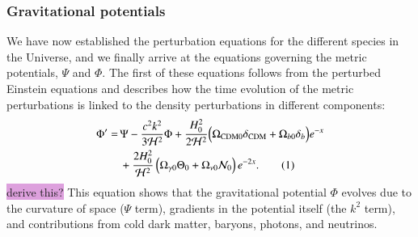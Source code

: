 \documentclass{aa}
\newcommand\numberthis{\addtocounter{equation}{1}\tag{\theequation}}
\numberwithin{equation}{section}
\numberwithin{table}{section}
\numberwithin{figure}{section}
\begin{document}
\subsubsection{Gravitational potentials}
We have now established the perturbation equations for the different species in the Universe, and we finally arrive at the equations governing the metric potentials, $\Psi$ and $\Phi$. 
The first of these equations follows from the perturbed Einstein equations and describes how the time evolution of the metric perturbations is linked to the density perturbations in different components:
\begin{align*}
\Phi' =\, &\Psi - \frac{c^2 k^2}{3\mathcal{H}^2} \Phi + \frac{H_0^2}{2\mathcal{H}^2} \Big(\Omega_{\text{CDM}0} \delta_{\text{CDM}} + \Omega_{b0} \delta_b\Big)e^{-x} \label{eq: dPhidx}
\\
&+ \frac{2H_0^2}{\mathcal{H}^2}\left(\Omega_{\gamma0} \Theta_0 + \Omega_{\nu0} \mathcal{N}_0 \right)e^{-2x}. \numberthis
\end{align*}
\colorbox{Plum}{derive this?} This equation shows that the gravitational potential $\Phi$ evolves due to the curvature of space ($\Psi$ term), gradients in the potential itself (the $k^2$ term), and contributions from cold dark matter, baryons, photons, and neutrinos. 
\end{document}
